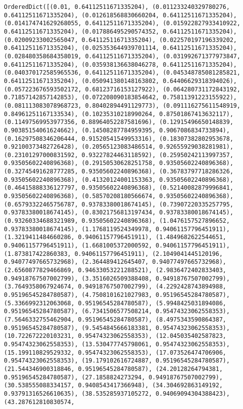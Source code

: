 \documentclass[11pt]{article}
\begin{document}
    \begin{Verbatim}[commandchars=\\\{\}]
OrderedDict([(0.01, 0.64112511671335204), (0.011233240329780276, 0.64112511671335204), (0.012618568830660204, 0.64112511671335204), (0.014174741629268055, 0.64112511671335204), (0.015922827933410922, 0.64112511671335204), (0.017886495290574352, 0.64112511671335204), (0.02009233002565047, 0.64112511671335204), (0.022570197196339202, 0.64112511671335204), (0.025353644939701114, 0.64112511671335204), (0.028480358684358019, 0.64112511671335204), (0.031992671377973847, 0.64112511671335204), (0.035938136638046278, 0.64112511671335204), (0.040370172585965536, 0.64112511671335204), (0.045348785081285821, 0.64112511671335204), (0.050941380148163802, 0.64406629318394026), (0.057223676593502172, 0.68123716153127922), (0.064280731172843192, 0.71857142857142853), (0.072208090183854642, 0.75811391223155922), (0.081113083078968723, 0.80402894491129773), (0.091116275611548919, 0.84961251167133534), (0.10235310218990264, 0.87501867413632117), (0.11497569953977356, 0.88964052287581696), (0.12915496650148839, 0.90385154061624662), (0.14508287784959395, 0.9067086834733894), (0.16297508346206444, 0.91520541549953316), (0.18307382802953678, 0.92100373482726428), (0.20565123083486514, 0.92655929038281981), (0.23101297000831592, 0.93227824463118592), (0.25950242113997357, 0.93505602240896368), (0.29150530628251758, 0.93505602240896368), (0.32745491628777285, 0.93505602240896368), (0.36783797718286326, 0.93505602240896368), (0.41320124001153363, 0.93505602240896368), (0.46415888336127797, 0.93505602240896368), (0.52140082879996841, 0.93505602240896368), (0.58570208180566674, 0.93505602240896368), (0.65793322465756787, 0.93783380018674145), (0.73907220335257795, 0.93783380018674145), (0.83021756813197434, 0.93783380018674145), (0.93260334688321989, 0.93505602240896368), (1.0476157527896652, 0.93783380018674145), (1.1768119524349978, 0.94061157796451911), (1.3219411484660286, 0.94061157796451911), (1.4849682622544651, 0.94061157796451911), (1.6681005372000592, 0.94061157796451911), (1.873817422860383, 0.94061157796451911), (2.1049041445120196, 0.94077497665732968), (2.364489412645407, 0.94077497665732968), (2.6560877829466869, 0.94633053221288521), (2.9836472402833403, 0.94918767507002799), (3.3516026509388408, 0.94918767507002799), (3.7649358067924674, 0.94918767507002799), (4.2292428743894988, 0.95196545284780587), (4.7508101621027983, 0.95196545284780587), (5.3366992312063068, 0.95196545284780587), (5.9948425031894086, 0.95196545284780587), (6.7341506577508214, 0.95474323062558353), (7.5646332755462904, 0.95196545284780587), (8.4975343590864387, 0.95196545284780587), (9.5454845666183381, 0.95474323062558353), (10.722672220103231, 0.95474323062558353), (12.045035402587823, 0.95474323062558353), (13.530477745798061, 0.95474323062558353), (15.199110829529332, 0.95474323062558353), (17.073526474706906, 0.95474323062558353), (19.179102616724887, 0.95196545284780587), (21.544346900318846, 0.95196545284780587), (24.20128264794381, 0.95196545284780587), (27.1858824273294, 0.94918767507002799), (30.538555088334157, 0.9408543417366948), (34.304692863149192, 0.93791316526610635), (38.535285937105272, 0.94069094304388423), (43.287612810830574, 
\end{Verbatim}
\end{document}
